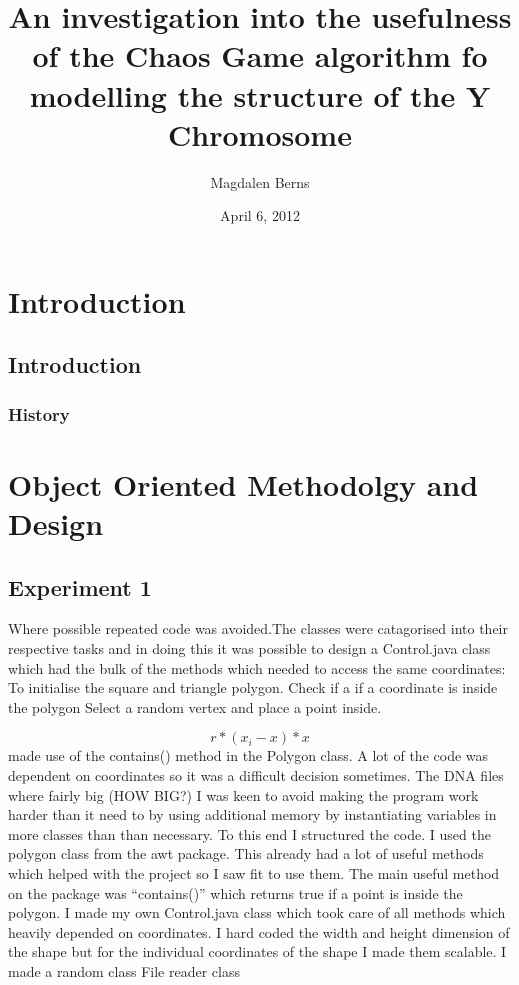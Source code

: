 \documentclass[]{report}   %
\begin{document}
\title{An investigation into the usefulness of the Chaos Game algorithm fo modelling the structure of the Y Chromosome }   %
\author{Magdalen Berns}         %
\date{April 6, 2012}    %
\maketitle
\chapter*{Introduction} 


\section{Introduction}     %
\subsection{History}       %

\chapter*{Object Oriented Methodolgy and Design} 

\section{Experiment 1}     %
Where possible repeated code was avoided.The classes were catagorised into their respective tasks and in doing this it was
possible to design a Control.java class which had the bulk of the methods which needed to access the same coordinates:
To initialise the square and triangle polygon.
Check if a if a coordinate is inside the polygon
Select a random vertex and place a point inside.

 
\begin{equation}
 r * (x_{i}-x)*x
\end{equation}
made use of the contains() method in the Polygon class. 
 A lot of the code was dependent on coordinates so it was a difficult decision sometimes. 
	The DNA  files where fairly big (HOW BIG?) I was keen to avoid making the 	program work harder than it need to by using additional memory by instantiating variables in more classes than than necessary.
	To this end I structured the code.
	I used the polygon class from the awt package. This already had a lot of useful methods which helped with the project so I saw fit to use them. The main useful method on the package was “contains()” which returns true if a point is inside the polygon.
	I made my own Control.java class which took care of all methods which heavily depended on coordinates. I hard coded the width and height dimension of the shape but for the individual coordinates of the shape I made them scalable.  
	I made a random class 
	File reader class
	
\end{document}
